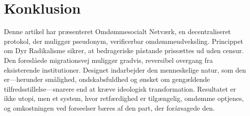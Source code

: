 \documentclass[11pt,a4paper,twocolumn]{article}
\begin{document}
\section{Konklusion}

Denne artikel har præsenteret Omdømmesocialt Netværk, en decentraliseret protokol, der muliggør pseudonym, verificerbar omdømmeudveksling. Princippet om Dyr Radikalisme sikrer, at bedrageriske påstande prissættes ud uden censur. Den foreslåede migrationsvej muliggør gradvis, reversibel overgang fra eksisterende institutioner. Designet indarbejder den menneskelige natur, som den er---herunder smålighed, ondskabsfuldhed og ønsket om gengældende tilfredsstillelse---snarere end at kræve ideologisk transformation. Resultatet er ikke utopi, men et system, hvor retfærdighed er tilgængelig, omdømme optjenes, og omkostningen ved forseelser bæres af den part, der forårsagede den.


\end{document}
